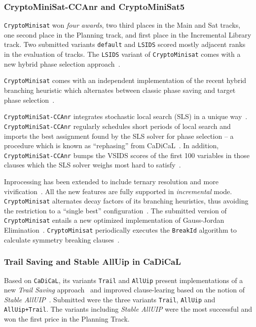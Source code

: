 \documentclass{elsarticle}
\newcommand{\solver}[1]{\texttt{#1}}
\begin{document}
\subsubsection{CryptoMiniSat-CCAnr and CryptoMiniSat5}
\label{sec:cryptominisat}

\solver{CryptoMinisat} won \emph{four awards}, two third places in the Main and Sat tracks, one second place in the Planning track, and first place in the Incremental Library track. 
Two submitted variants \solver{default} and \solver{LSIDS} scored mostly adjacent ranks in the evaluation of tracks. 
The \solver{LSIDS} variant of \solver{CryptoMinisat} comes with a new hybrid phase selection approach~\cite{Shaw:2020:LSIDS,Soos:SC2020}.

\solver{CryptoMinisat} comes with an independent implementation of the recent hybrid branching heuristic which alternates between classic phase saving and target phase selection~\cite{Biere:SC2019}.

\solver{CryptoMiniSat-CCAnr} integrates stochastic local search (SLS) in a unique way~\cite{Cai:2015:CCAnr}. 
\solver{CryptoMiniSat-CCAnr} regularly schedules short periods of local search and imports the best assignment found by the SLS solver for phase selection -- a procedure which is known as ``rephasing'' from CaDiCaL~\cite{Biere:SC2019}.
In addition, \solver{CryptoMiniSat-CCAnr} bumps the VSIDS scores of the first 100 variables in those clauses which the SLS solver weighs most hard to satisfy~\cite{Soos:SC2020}.

Inprocessing has been extended to include ternary resolution and more vivification~\cite{ChuMinLi:2020:Vivification}. 
All the new features are fully supported in \emph{incremental} mode. 
\solver{CryptoMinisat} alternates decay factors of its branching heuristics, thus avoiding the restriction to a ``single best'' configuration~\cite{Soos:SC2020}. 
The submitted version of \solver{CryptoMinisat} entails a new optimized implementation of Gauss-Jordan Elimination~\cite{Soos:2020:CNFXOR}. 
\solver{CryptoMinisat} periodically executes the \solver{BreakId} algorithm to  calculate symmetry breaking clauses~\cite{Devriendt:2016:BreakId}.


\subsubsection{Trail Saving and Stable AllUip in CaDiCaL}

Based on \solver{CaDiCaL}, its variants \solver{Trail} and \solver{AllUip} present implementations of a new \emph{Trail Saving} approach~\cite{Hickey:2020:TrailSaving} and improved clause-learing based on the notion of \emph{Stable AllUIP}~\cite{Bacchus:SC2020}. 
Submitted were the three variants \solver{Trail}, \solver{AllUip} and \solver{AllUip+Trail}. 
The variants including \emph{Stable AllUIP} were the most successful and won the first price in the Planning Track. 
\end{document}
